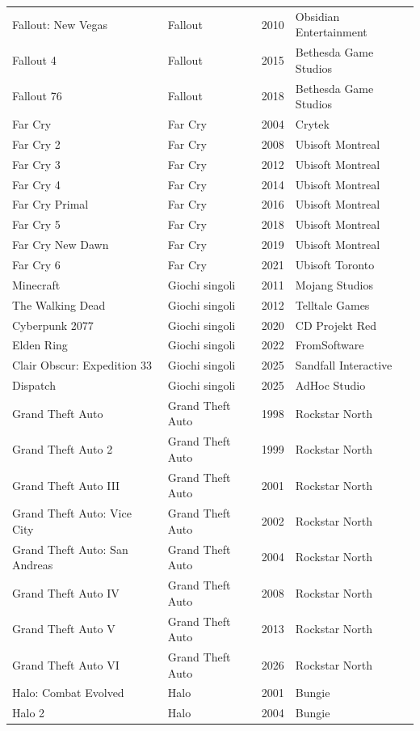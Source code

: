 \begin{longtable}{p{6.5cm}p{3cm}lp{3.5cm}}
Fallout: New Vegas & Fallout & 2010 & Obsidian Entertainment \\
Fallout 4 & Fallout & 2015 & Bethesda Game Studios \\
Fallout 76 & Fallout & 2018 & Bethesda Game Studios \\
Far Cry & Far Cry & 2004 & Crytek \\
Far Cry 2 & Far Cry & 2008 & Ubisoft Montreal \\
Far Cry 3 & Far Cry & 2012 & Ubisoft Montreal \\
Far Cry 4 & Far Cry & 2014 & Ubisoft Montreal \\
Far Cry Primal & Far Cry & 2016 & Ubisoft Montreal \\
Far Cry 5 & Far Cry & 2018 & Ubisoft Montreal \\
Far Cry New Dawn & Far Cry & 2019 & Ubisoft Montreal \\
Far Cry 6 & Far Cry & 2021 & Ubisoft Toronto \\
Minecraft & Giochi singoli & 2011 & Mojang Studios \\
The Walking Dead & Giochi singoli & 2012 & Telltale Games \\
Cyberpunk 2077 & Giochi singoli & 2020 & CD Projekt Red \\
Elden Ring & Giochi singoli & 2022 & FromSoftware \\
Clair Obscur: Expedition 33 & Giochi singoli & 2025 & Sandfall Interactive \\
Dispatch & Giochi singoli & 2025 & AdHoc Studio \\
Grand Theft Auto & Grand Theft Auto & 1998 & Rockstar North \\
Grand Theft Auto 2 & Grand Theft Auto & 1999 & Rockstar North \\
Grand Theft Auto III & Grand Theft Auto & 2001 & Rockstar North \\
Grand Theft Auto: Vice City & Grand Theft Auto & 2002 & Rockstar North \\
Grand Theft Auto: San Andreas & Grand Theft Auto & 2004 & Rockstar North \\
Grand Theft Auto IV & Grand Theft Auto & 2008 & Rockstar North \\
Grand Theft Auto V & Grand Theft Auto & 2013 & Rockstar North \\
Grand Theft Auto VI & Grand Theft Auto & 2026 & Rockstar North \\
Halo: Combat Evolved & Halo & 2001 & Bungie \\
Halo 2 & Halo & 2004 & Bungie \\

\end{longtable}
